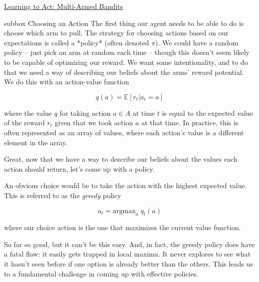 \begin{textbox}{\href{https://compneuro.neuromatch.io/tutorials/W3D4_ReinforcementLearning/student/W3D4_Tutorial2.html}{Learning to Act: Multi-Armed Bandits } }
\begin{subbox}{subbox}{ Choosing an Action}
\scriptsize
The first thing our agent needs to be able to do is choose which arm to pull. The strategy for choosing actions based on our expectations is called a *policy* (often denoted $\pi$). We could have a random policy -- just pick an arm at random each time -- though this doesn't seem likely to be capable of optimizing our reward. We want some intentionality, and to do that we need a way of describing our beliefs about the arms' reward potential. We do this with an action-value function

\begin{equation}
q(a) = \mathbb{E} [r_{t} | a_{t} = a]
\end{equation}

where the value $q$ for taking action $a \in A$ at time $t$ is equal to the expected value of the reward $r_t$ given that we took action $a$ at that time. In practice, this is often represented as an array of values, where each action's value is a different element in the array.

Great, now that we have a way to describe our beliefs about the values each action should return, let's come up with a policy.

An obvious choice would be to take the action with the highest expected value. This is referred to as the \textit{greedy} policy

\begin{equation}
a_{t} = \text{argmax}_{a} \; q_{t} (a)
\end{equation}

where our choice action is the one that maximizes the current value function.

So far so good, but it can't be this easy. And, in fact, the greedy policy does have a fatal flaw: it easily gets trapped in local maxima. It never explores to see what it hasn't seen before if one option is already better than the others. This leads us to a fundamental challenge in coming up with effective policies.

\end{subbox}

\end{textbox}
